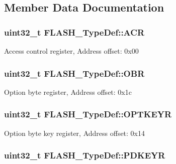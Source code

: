 \subsection{Member Data Documentation}
\hypertarget{struct_f_l_a_s_h___type_def_aaf432a8a8948613f4f66fcace5d2e5fe}{
\subsubsection[{A\-C\-R}]{ uint32\-\_\-t F\-L\-A\-S\-H\-\_\-\-Type\-Def\-::\-A\-C\-R}}\label{struct_f_l_a_s_h___type_def_aaf432a8a8948613f4f66fcace5d2e5fe}
Access control register, Address offset\-: 0x00 \hypertarget{struct_f_l_a_s_h___type_def_a24dece1e3b3185456afe34c3dc6add2e}{
\subsubsection[{O\-B\-R}]{ uint32\-\_\-t F\-L\-A\-S\-H\-\_\-\-Type\-Def\-::\-O\-B\-R}}\label{struct_f_l_a_s_h___type_def_a24dece1e3b3185456afe34c3dc6add2e}
Option byte register, Address offset\-: 0x1c \hypertarget{struct_f_l_a_s_h___type_def_a793cd13a4636c9785fdb99316f7fd7ab}{
\subsubsection[{O\-P\-T\-K\-E\-Y\-R}]{ uint32\-\_\-t F\-L\-A\-S\-H\-\_\-\-Type\-Def\-::\-O\-P\-T\-K\-E\-Y\-R}}\label{struct_f_l_a_s_h___type_def_a793cd13a4636c9785fdb99316f7fd7ab}
Option byte key register, Address offset\-: 0x14 \hypertarget{struct_f_l_a_s_h___type_def_a17d6fcde53db4cb932b3fbfe08235b31}{
\subsubsection[{P\-D\-K\-E\-Y\-R}]{ uint32\-\_\-t F\-L\-A\-S\-H\-\_\-\-Type\-Def\-::\-P\-D\-K\-E\-Y\-R}}\label{struct_f_l_a_s_h___type_def_a17d6fcde53db4cb932b3fbfe08235b31}
